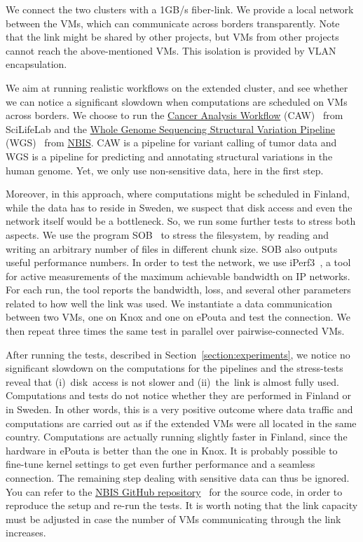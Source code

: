 We connect the two clusters with a 1GB/s fiber-link. We provide a
local network between the VMs, which can communicate across borders
transparently.
%
Note that the link might be shared by other projects, but VMs from
other projects cannot reach the above-mentioned VMs.
%
This isolation is provided by VLAN encapsulation.


We aim at running realistic workflows on the extended cluster, and see
whether we can notice a significant slowdown when computations are
scheduled on VMs across borders.
%
We choose to run the \href{https://github.com/SciLifeLab/CAW}{Cancer
  Analysis Workflow} (CAW)~\cite{caw} from SciLifeLab and the
\href{https://github.com/NBISweden/wgs-structvar}{Whole Genome
  Sequencing Structural Variation Pipeline} (WGS)~\cite{caw} from
\href{http://www.nbis.se}{NBIS}.
%
CAW is a pipeline for variant calling of tumor data and WGS is a
pipeline for predicting and annotating structural variations in the
human genome.
%
Yet, we only use non-sensitive data, here in the first step.

Moreover, in this approach, where computations might be scheduled in
Finland, while the data has to reside in Sweden, we suspect that disk
access and even the network itself would be a bottleneck. So, we run
some further tests to stress both aspects.
%
We use the program SOB~\cite{sob} to stress the filesystem, by reading
and writing an arbitrary number of files in different chunk size. SOB
also outputs useful performance numbers.
%
In order to test the network, we use iPerf3~\cite{iperf}, a tool for
active measurements of the maximum achievable bandwidth on IP
networks.
%
For each run, the tool reports the bandwidth, loss, and several other
parameters related to how well the link was used.
%
We instantiate a data communication between two VMs, one on Knox and
one on ePouta and test the connection.
%
We then repeat three times the same test in parallel over
pairwise-connected VMs.


After running the tests, described in
Section~\ref{section:experiments}, we notice no significant slowdown
on the computations for the pipelines and the stress-tests reveal that
(i)~disk~access is not slower and (ii)~the~link is almost fully used.
%
Computations and tests do not notice whether they are performed in
Finland or in Sweden.
%
In other words, this is a very positive outcome where data traffic and
computations are carried out as if the extended VMs were all located
in the same country.
%
Computations are actually running slightly faster in Finland, since
the hardware in ePouta is better than the one in Knox.
%
It is probably possible to fine-tune kernel settings
to get even further performance and a seamless connection.
%
The remaining step dealing with sensitive data can thus be ignored.
%
You can refer to the
\href{https://github.com/NBISweden/Knox-ePouta}{NBIS GitHub
  repository}~\cite{nbis-knox-epouta} for the source code, in order to
reproduce the setup and re-run the tests.
%
It is worth noting that the link capacity must be adjusted in case the
number of VMs communicating through the link increases.
